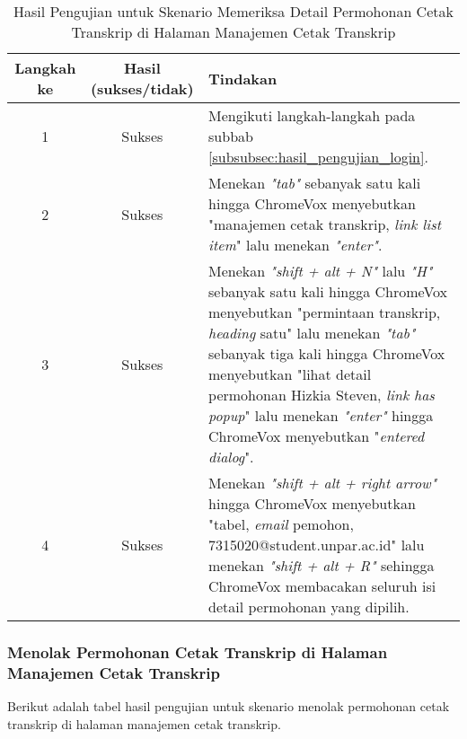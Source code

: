 \begin{table}[H]
    \centering 
    \caption{Hasil Pengujian untuk Skenario Memeriksa Detail Permohonan Cetak Transkrip di Halaman Manajemen Cetak Transkrip}
    \label{tab:hasil_pengujian_memeriksa_detail_permohonan_cetak_transkrip_di_halaman_manajemen_cetak_transkrip}
    \begin{tabular}{|c|c|p{10cm}|}
        \toprule
        Langkah ke & Hasil (sukses/tidak) & Tindakan \\

        \midrule
        1 & Sukses & Mengikuti langkah-langkah pada subbab \ref{subsubsec:hasil_pengujian_login}. \\
        2 & Sukses & Menekan \textit{"tab"} sebanyak satu kali hingga ChromeVox menyebutkan "manajemen cetak transkrip, \textit{link list item}" lalu menekan \textit{"enter"}. \\
        3 & Sukses & Menekan \textit{"shift + alt + N"} lalu \textit{"H"} sebanyak satu kali hingga ChromeVox menyebutkan "permintaan transkrip, \textit{heading} satu" lalu menekan \textit{"tab"} sebanyak tiga kali hingga ChromeVox menyebutkan "lihat detail permohonan Hizkia Steven, \textit{link has popup}" lalu menekan \textit{"enter"} hingga ChromeVox menyebutkan "\textit{entered dialog}". \\
        4 & Sukses & Menekan \textit{"shift + alt + right arrow"} hingga ChromeVox menyebutkan "tabel, \textit{email} pemohon, 7315020@student.unpar.ac.id" lalu menekan \textit{"shift + alt + R"} sehingga ChromeVox membacakan seluruh isi detail permohonan yang dipilih. \\

        \bottomrule

    \end{tabular}
\end{table}

\subsubsection{Menolak Permohonan Cetak Transkrip di Halaman Manajemen Cetak Transkrip}
\label{subsubsec:hasil_pengujian_menolak_permohonan_cetak_transkrip_di_halaman_manajemen_cetak_transkrip}
Berikut adalah tabel hasil pengujian untuk skenario menolak permohonan cetak transkrip di halaman manajemen cetak transkrip.

